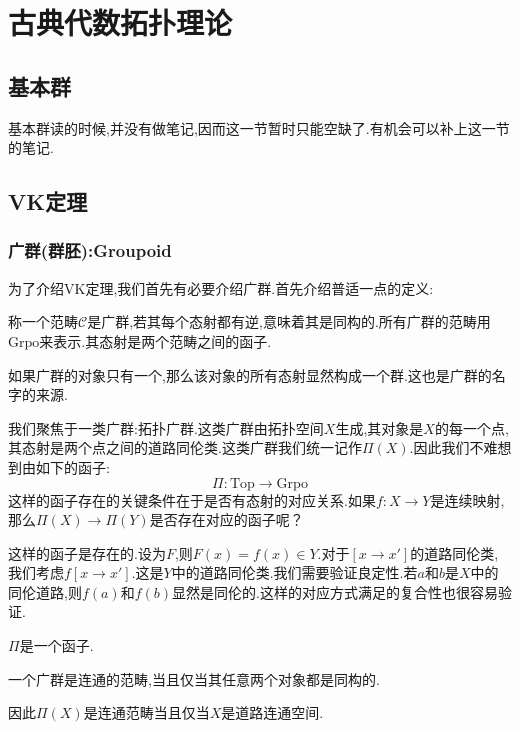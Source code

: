\ifx\allfiles\undefined

	
	
\else
\fi
\part{古典代数拓扑理论}
\chapter{基本群}
基本群读的时候,并没有做笔记,因而这一节暂时只能空缺了.有机会可以补上这一节的笔记.
\chapter{VK定理}
\section{广群(群胚):Groupoid}
为了介绍VK定理,我们首先有必要介绍广群.首先介绍普适一点的定义:
\begin{definition}
    称一个范畴$\mathcal{C}$是广群,若其每个态射都有逆,意味着其是同构的.所有广群的范畴用$\mathrm{Grpo}$来表示.其态射是两个范畴之间的函子.
\end{definition}
    如果广群的对象只有一个,那么该对象的所有态射显然构成一个群.这也是广群的名字的来源.

    我们聚焦于一类广群:拓扑广群.这类广群由拓扑空间$X$生成,其对象是$X$的每一个点,其态射是两个点之间的道路同伦类.这类广群我们统一记作$\Pi(X)$.因此我们不难想到由如下的函子:
    $$
    \Pi: \mathrm{Top} \to \mathrm{Grpo}
    $$
    这样的函子存在的关键条件在于是否有态射的对应关系.如果$f:X \to Y$是连续映射,那么$\Pi(X)\to \Pi(Y)$是否存在对应的函子呢？

    这样的函子是存在的.设为$F$,则$F(x)=f(x)\in Y$.对于$[x \to x']$的道路同伦类,我们考虑$f[x \to x']$.这是$Y$中的道路同伦类.我们需要验证良定性.若$a$和$b$是$X$中的同伦道路,则$f(a)$和$f(b)$显然是同伦的.这样的对应方式满足的复合性也很容易验证.

    \begin{proposition}
        $\Pi$是一个函子.
    \end{proposition}
    \begin{proposition}
        一个广群是连通的范畴,当且仅当其任意两个对象都是同构的.
    \end{proposition}
    因此$\Pi(X)$是连通范畴当且仅当$X$是道路连通空间.
